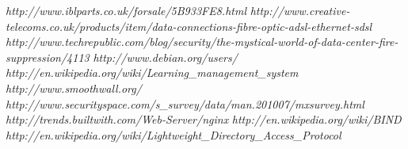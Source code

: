\documentclass[a4paper, twoside]{article}
\begin{document}
\begin{thebibliography}{1}

 {\em http://www.iblparts.co.uk/forsale/5B933FE8.html}
 {\em
  http://www.creative-telecoms.co.uk/products/item/data-connections-fibre-optic-adsl-ethernet-sdsl}
 {\em
  http://www.techrepublic.com/blog/security/the-mystical-world-of-data-center-fire-suppression/4113}
 {\em http://www.debian.org/users/}
 {\em http://en.wikipedia.org/wiki/Learning\_management\_system}
 {\em http://www.smoothwall.org/}
 {\em http://www.securityspace.com/s\_survey/data/man.201007/mxsurvey.html}
 {\em http://trends.builtwith.com/Web-Server/nginx}
 {\em http://en.wikipedia.org/wiki/BIND}
 {\em http://en.wikipedia.org/wiki/Lightweight\_Directory\_Access\_Protocol}

\end{thebibliography}
\end{document}
